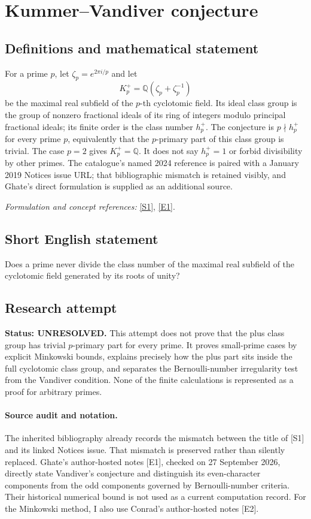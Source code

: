 \documentclass[11pt]{article}
\begin{document}
\section*{\texorpdfstring{Kummer–Vandiver conjecture}{Kummer–Vandiver conjecture}}\label{statement}
\subsection{Definitions and mathematical statement}
For a prime $p$, let $\zeta_p=e^{2\pi i/p}$ and let
\[
 K_p^+={\mathbb{Q}}(\zeta_p+\zeta_p^{-1})
\]
be the maximal real subfield of the $p$-th cyclotomic field. Its ideal class group is the group of nonzero fractional ideals of its ring of integers modulo principal fractional ideals; its finite order is the class number $h_p^+$. The conjecture is $p\nmid h_p^+$ for every prime $p$, equivalently that the $p$-primary part of this class group is trivial. The case $p=2$ gives $K_p^+={\mathbb{Q}}$. It does not say $h_p^+=1$ or forbid divisibility by other primes. The catalogue's named 2024 reference is paired with a January 2019 Notices issue URL; that bibliographic mismatch is retained visibly, and Ghate's direct formulation is supplied as an additional source.
\par\smallskip\textit{Formulation and concept references:} \href{https://www.ams.org/journals/notices/201901/201901FullIssue.pdf}{[S1]}, \href{https://mathweb.tifr.res.in/~eghate/vandiver.pdf}{[E1]}.

\subsection{Short English statement}
Does a prime never divide the class number of the maximal real subfield of the cyclotomic field generated by its roots of unity?
\subsection{Research attempt}
\textbf{Status: UNRESOLVED.} This attempt does not prove that the plus class group has trivial $p$-primary part for every prime. It proves small-prime cases by explicit Minkowski bounds, explains precisely how the plus part sits inside the full cyclotomic class group, and separates the Bernoulli-number irregularity test from the Vandiver condition. None of the finite calculations is represented as a proof for arbitrary primes.

\paragraph{Source audit and notation.}
The inherited bibliography already records the mismatch between the title of [S1] and its linked Notices issue. That mismatch is preserved rather than silently replaced. Ghate's author-hosted notes [E1], checked on 27 September 2026, directly state Vandiver's conjecture and distinguish its even-character components from the odd components governed by Bernoulli-number criteria. Their historical numerical bound is not used as a current computation record. For the Minkowski method, I also use Conrad's author-hosted notes [E2].
\end{document}
